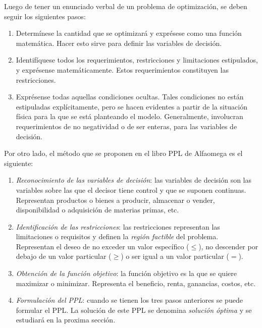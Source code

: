 \begin{tcolorbox}[title=Método del libro Bronson]
  Luego de tener un enunciado verbal de un problema de optimización, se deben seguir los siguientes pasos:
  \begin{enumerate}
    \item Determínese la cantidad que se optimizará y exprésese como una función matemática. Hacer esto sirve para definir las variables de decisión.
    \item Identifíquese todos los requerimientos, restricciones y limitaciones estipulados, y exprésense matemáticamente. Estos requerimientos constituyen las restricciones.
    \item Exprésense todas aquellas condiciones ocultas. Tales condiciones no están estipuladas explícitamente, pero se hacen evidentes a partir de la situación física para la que se está planteando el modelo. Generalmente, involucran requerimientos de no negatividad o de ser enteras, para las variables de decisión.
  \end{enumerate}  
\end{tcolorbox}

\noindent Por otro lado, el método que se proponen en el libro PPL de Alfaomega es el siguiente:
\begin{tcolorbox}[title=Método del libro Alfaomega]
  \begin{enumerate}
    \item \textit{Reconocimiento de las variables de decisión}: las variables de decisión son las variables sobre las que el decisor tiene control y que se suponen continuas. Representan productos o bienes a producir, almacenar o vender, disponibilidad o adquisición de materias primas, etc.
    \item \textit{Identificación de las restricciones}: las restricciones representan las limitaciones o requisitos y definen la \textit{región factible} del problema. Representan el deseo de no exceder un valor específico (\(\leq\)), no descender por debajo de un valor particular (\(\geq\)) o ser igual a un valor particular (\(=\)).
    \item \textit{Obtención de la función objetivo}: la función objetivo es la que se quiere maximizar o minimizar. Representa el beneficio, renta, ganancias, costos, etc.
    \item \textit{Formulación del PPL}: cuando se tienen los tres pasos anteriores se puede formular el PPL. La solución de este PPL se denomina \textit{solución óptima} y se estudiará en la proxima sección.
  \end{enumerate}
\end{tcolorbox}

